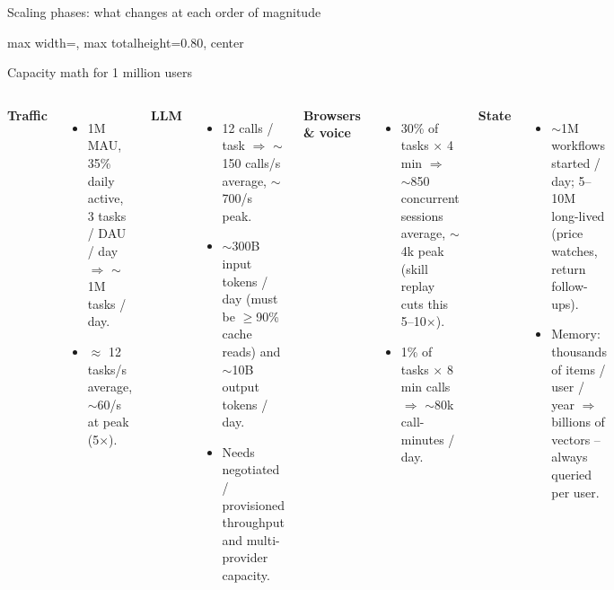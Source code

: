 \documentclass[aspectratio=169,10pt]{beamer}
\newenvironment{diagram}{\begin{adjustbox}{max width=\linewidth, max totalheight=0.80\textheight, center}}{\end{adjustbox}}
\begin{document}
\begin{frame}{Scaling phases: what changes at each order of magnitude}
\begin{diagram}
\end{diagram}
\end{frame}

\begin{frame}{Capacity math for 1 million users}
\begin{columns}[T]
\small
\textbf{Traffic}
\begin{itemize}
  \item 1M MAU, 35\% daily active, 3 tasks / DAU / day $\Rightarrow$ $\sim$1M tasks / day.
  \item $\approx$ 12 tasks/s average, $\sim$60/s at peak (5$\times$).
\end{itemize}
\textbf{LLM}
\begin{itemize}
  \item 12 calls / task $\Rightarrow$ $\sim$150 calls/s average, $\sim$700/s peak.
  \item $\sim$300B input tokens / day (must be $\ge$90\% cache reads) and $\sim$10B output tokens / day.
  \item Needs negotiated / provisioned throughput and multi-provider capacity.
\end{itemize}
\small
\textbf{Browsers \& voice}
\begin{itemize}
  \item 30\% of tasks $\times$ 4 min $\Rightarrow$ $\sim$850 concurrent sessions average, $\sim$4k peak (skill replay cuts this 5--10$\times$).
  \item 1\% of tasks $\times$ 8 min calls $\Rightarrow$ $\sim$80k call-minutes / day.
\end{itemize}
\textbf{State}
\begin{itemize}
  \item $\sim$1M workflows started / day; 5--10M long-lived (price watches, return follow-ups).
  \item Memory: thousands of items / user / year $\Rightarrow$ billions of vectors -- always queried per user.
\end{itemize}
\end{columns}
\end{frame}
\end{document}
